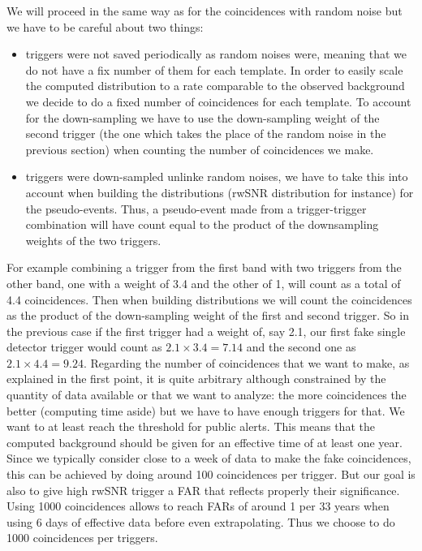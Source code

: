We will proceed in the same way as for the coincidences with random noise but we have to be careful about two things:
\begin{itemize}
\item triggers were not saved periodically as random noises were, meaning that we do not have a fix number of them for each template.
  In order to easily scale the computed distribution to a rate comparable to the observed background we decide to do a fixed number of coincidences for each template.
  To account for the down-sampling we have to use the down-sampling weight of the second trigger (the one which takes the place of the random noise in the previous section) when counting the number of coincidences we make.
\item triggers were down-sampled unlinke random noises, we have to take this into account when building the distributions (rwSNR distribution for instance) for the pseudo-events.
  Thus, a pseudo-event made from a trigger-trigger combination will have count equal to the product of the downsampling weights of the two triggers.
\end{itemize}
For example combining a trigger from the first band with two triggers from the other band, one with a weight of 3.4 and the other of 1, will count as a total of 4.4 coincidences.
Then when building distributions we will count the coincidences as the product of the down-sampling weight of the first and second trigger.
So in the previous case if the first trigger had a weight of, say 2.1, our first fake single detector trigger would count as $2.1 \times 3.4 = 7.14$ and the second one as $2.1 \times 4.4 = 9.24$.
Regarding the number of coincidences that we want to make, as explained in the first point, it is quite arbitrary although constrained by the quantity of data available or that we want to analyze: the more coincidences the better (computing time aside) but we have to have enough triggers for that.
We want to at least reach the threshold for public alerts.
This means that the computed background should be given for an effective time of at least one year.
Since we typically consider close to a week of data to make the fake coincidences, this can be achieved by doing around 100 coincidences per trigger.
But our goal is also to give high rwSNR trigger a FAR that reflects properly their significance.
Using 1000 coincidences allows to reach FARs of around 1 per 33 years when using 6 days of effective data before even extrapolating.
Thus we choose to do 1000 coincidences per triggers.

